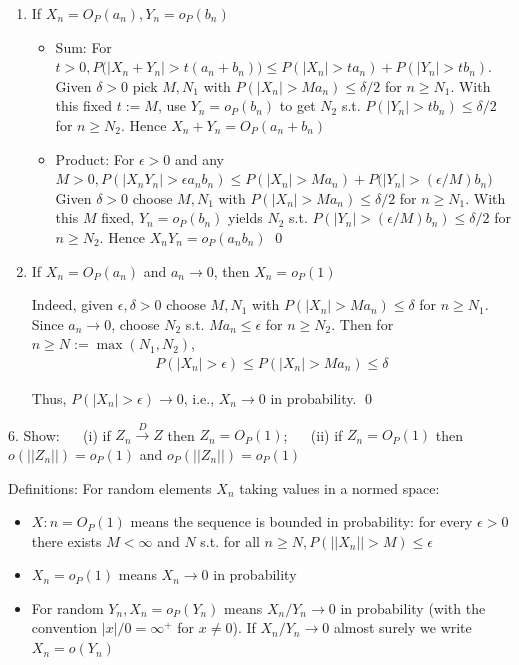 \documentclass[10pt]{article}
\begin{document}
\begin{enumerate}[label=\textit{(\roman*)}]
\begin{itemize}
    \end{itemize}
    \item If $X_n = O_P(a_n), Y_n = o_P(b_n)$
    \begin{itemize}
        \item Sum: For $t > 0, P\big(|X_n + Y_n| > t(a_n+b_n)\big) \leq P(|X_n| > t a_n) + P(|Y_n| > t b_n)$. Given $\delta > 0$ pick $M, N_1$ with $P(|X_n| > M a_n) \leq \delta / 2$ for $n \geq N_1$. With this fixed $t:=M$, use $Y_n = o_P(b_n)$ to get $N_2$ s.t. $P(|Y_n| > t b_n) \leq \delta / 2$ for $n \geq N_2$. Hence $X_n + Y_n = O_P(a_n + b_n)$
        \item Product: For $\epsilon > 0$ and any $M > 0, P(|X_nY_n| > \epsilon a_nb_n) \leq P(|X_n| > M a_n) + P\big(|Y_n| > (\epsilon/M) b_n\big)$ Given $\delta > 0$ choose $M, N_1$ with $P(|X_n| > M a_n) \leq \delta / 2$ for $n \geq N_1$. With this $M$ fixed, $Y_n = o_P(b_n)$ yields $N_2$ s.t. $P(|Y_n| > (\epsilon / M)b_n) \leq \delta / 2$ for $n \geq N_2$. Hence $X_nY_n = o_P(a_nb_n)$ \qed
    \end{itemize}
    \item If $X_n = O_P(a_n)$ and $a_n \to 0$, then $X_n = o_P(1)$
    
    Indeed, given $\epsilon, \delta > 0$ choose $M, N_1$ with $P(|X_n| > Ma_n) \leq \delta$ for $n \geq N_1$. Since $a_n \to 0$, choose $N_2$ s.t. $M a_n \leq \epsilon$ for $n \geq N_2$. Then for $n \geq N := \max (N_1, N_2)$,
    \begin{gather*}
        P(|X_n| > \epsilon) \leq P(|X_n| > Ma_n) \leq \delta
    \end{gather*}

    Thus, $P(|X_n| > \epsilon) \to 0$, i.e., $X_n \to 0$ in probability. \qed
\end{enumerate}

\newpage

6. Show: $\quad$ (i) if $Z_n \xrightarrow{D} Z$ then $Z_n = O_P(1)$; $\quad$ (ii) if $Z_n = O_P(1)$ then $o(||Z_n||) = o_P(1)$ and $o_P(||Z_n||) = o_P(1)$

Definitions: For random elements $X_n$ taking values in a normed space:

\begin{itemize}
    \item $X:n = O_P(1)$ means the sequence is bounded in probability: for every $\epsilon > 0$ there exists $M < \infty$ and $N$ s.t. for all $n \geq N, P(||X_n|| > M) \leq \epsilon$
    \item $X_n = o_P(1)$ means $X_n \to 0$ in probability
    \item For random $Y_n, X_n = o_P(Y_n)$ means $X_n / Y_n \to 0$ in probability (with the convention $|x| / 0 = \infty^+$ for $x \neq 0$). If $X_n / Y_n \to 0$ almost surely we write $X_n = o(Y_n)$
\end{itemize}
\end{document}
